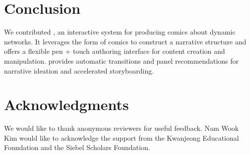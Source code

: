 \section{Conclusion}

We contributed \toolname{}, an interactive system for producing comics about dynamic networks. 
It leverages the form of comics to construct a narrative structure and offers a flexible pen + touch authoring interface for content creation and manipulation. \toolname{} provides automatic transitions and panel recommendations for narrative ideation and accelerated storyboarding. 

\section{Acknowledgments}
We would like to thank anonymous reviewers for useful feedback. Nam Wook Kim would like to acknowledge the support from the Kwanjeong Educational Foundation and the Siebel Scholars Foundation.
\newpage



